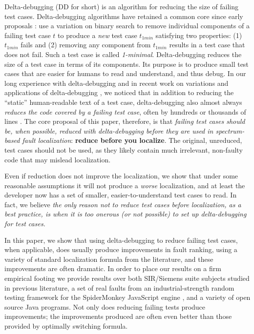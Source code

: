 Delta-debugging \cite{DD} (DD for short) is an algorithm for reducing
the size of failing test cases.  Delta-debugging algorithms have
retained a common core since early proposals \cite{DDISSTA}: use a
variation on binary search to remove individual components of a
failing test case $t$ to produce a \emph{new} test case $t_{1min}$
satisfying two properties: (1) $t_{1min}$ fails and (2) removing any
component from $t_{1min}$ results in a test case that does not fail.
Such a test case is called \emph{1-minimal}. 
Delta-debugging reduces the size of a test case in terms of its
components.  Its purpose is to produce small test cases that are
easier for humans to read and understand, and thus debug.  In our long
experience with delta-debugging \cite{ICSEDiff,AMAI} and in recent
work on variations and applications of delta-debugging
\cite{icst2014,issta14,PLDI13,NonAdeq,OneTest}, we noticed that in addition to
reducing the ``static'' human-readable text of a test case,
delta-debugging also almost always \emph{reduces the code covered by a
failing test case}, often by hundreds or thousands of lines
\cite{icst2014}.  The core proposal of this paper, therefore, is that
\emph{failing test cases should be, when possible, reduced with
delta-debugging before they are used in spectrum-based fault
localization}: {\bf reduce before you localize}.  The original,
unreduced, test cases should not be used, as they likely contain much
irrelevant, non-faulty code that may mislead localization.

Even if reduction does not improve the localization, we
show that under some reasonable assumptions it will not produce a
\emph{worse} localization, and at least the developer now has a set of
smaller, easier-to-understand test cases to read.  In fact, we believe
\emph{the only reason not to reduce test cases before localization, as a
best practice, is when it is too onerous (or not possible) to set up
delta-debugging for test cases.}

In this paper, we show that using delta-debugging to reduce failing
test cases, when applicable, does usually produce improvements in
fault ranking, using a variety of standard localization formula from
the literature, and these improvements are often dramatic.  In order
to place our results on a firm empirical footing \cite{Threats} we
provide results over both SIR/Siemens \cite{Siemens} suite subjects
studied in previous literature, a set of real faults from an
industrial-strength random testing framework for the SpiderMonkey
JavaScript engine \cite{icst2014,jsfunfuzz}, and a variety of open
source Java programs.  Not only does reducing failing tests produce
improvements; the improvements produced are often even better than
those provided by optimally switching formula.  
